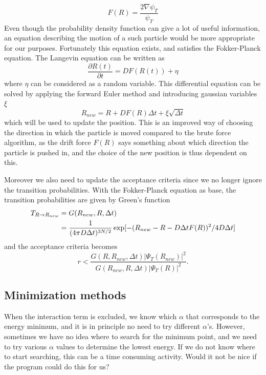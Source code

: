 \documentclass[norsk,a4paper,12pt]{article}
\begin{document}
\begin{equation}
	\label{eq:drift_force}
	F(R) = \frac{2 \nabla \psi_T}{\psi_T}
\end{equation}
Even though the probability density function can give a lot of useful information, an equation describing the motion of a such particle would be more appropriate for our purposes. Fortunately this equation exists, and satisfies the Fokker-Planck equation. The Langevin equation can be written as
\begin{equation}
\frac{\partial R(t)}{\partial t}=DF(R(t)) + \eta
\end{equation}
where $\eta$ can be considered as a random variable. This differential equation can be solved by applying the forward Euler method and introducing gaussian variables $\xi$
\begin{equation}
R_{new} = R + DF(R)\Delta t + \xi\sqrt{\Delta t}
\end{equation}
which will be used to update the position. This is an improved way of choosing the direction in which the particle is moved compared to the brute force algorithm, as the drift force $F(R)$ says something about which direction the particle is pushed in, and the choice of the new position is thus dependent on this.

Moreover we also need to update the acceptance criteria since we no longer ignore the transition probabilities. With the Fokker-Planck equation as base, the transition probabilities are given by Green's function
\begin{align}
T_{R\rightarrow R_{new}}&=G(R_{new},R,\Delta t)\notag\\
&=\frac{1}{(4\pi D\Delta t)^{3N/2}}\exp[-(R_{new} - R - D\Delta tF(R))^2/4D\Delta t] 
\end{align}
and the acceptance criteria becomes
\begin{equation}
r<\frac{G(R,R_{new},\Delta t)|\Psi_T(R_{new})|^2}{G(R_{new},R,\Delta t)|\Psi_T(R)|^2}.
\end{equation}



\subsection{Minimization methods}
When the interaction term is excluded, we know which $\alpha$ that corresponds to the energy minimum, and it is in principle no need to try different $\alpha$'s. However, sometimes we have no idea where to search for the minimum point, and we need to try various $\alpha$ values to determine the lowest energy. If we do not know where to start searching, this can be a time consuming activity. Would it not be nice if the program could do this for us?
\end{document}
